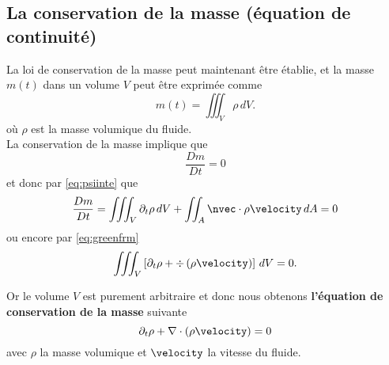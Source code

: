 \subsection{La conservation de la masse (équation de continuité)}
\noindent La loi de conservation de la masse peut maintenant être établie, et la masse $m(t)$ dans un volume $V$ peut être exprimée comme
\[ m(t) = \iiint_V \rho\, d V.\] où $\rho$ est la masse volumique du fluide.\\
La conservation de la masse implique que \[ \frac{D m}{D t} = 0\]
et donc par \eqref{eq:psiinte} que 
\begin{equation}
	\frac{D m}{D t} = \iiint_V \partial_t \rho\, d V + \iint_A \nvec \cdot \rho \velocity\, d A = 0
\end{equation}
ou encore par \eqref{eq:greenfrm}
\begin{equation}
	\iiint_V \left[\partial_t \rho + \div\left(\rho \velocity\right)\right]\,d V = 0.
\end{equation}
\begin{refe}
Or le volume $V$ est purement arbitraire et donc nous obtenons \textbf{l'équation de conservation de la masse} suivante
\begin{equation}
	\partial_t \rho + \nabla \cdot \left(\rho \velocity\right) = 0\label{eq:consmass}
\end{equation}
avec $\rho$ la masse volumique et $\velocity$ la vitesse du fluide.
\end{refe}

